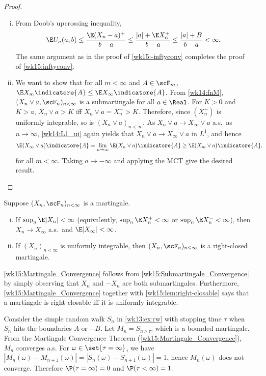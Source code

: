 \documentclass[../aipt.tex]{subfiles}
\begin{document}
\begin{proof}
\begin{enumerate}[(i)]
	\item From Doob's upcrossing inequality, 
	\begin{align*}
	\E U_n(a,b) \leq \frac{\E(X_n-a)^+}{b-a}  \leq \frac{|a|+\E X_n^+}{b-a} \leq \frac{|a|+B}{b-a} <\infty.
	\end{align*}
	The same argument as in the proof of \cref{wk15:-inftyconv} completes the proof of \cref{wk15:inftyconv}.
	
	\item We want to show that for all $m<\infty$ and $A\in\scF_m$, $\E X_m\indicatore{A} \leq \E X_\infty\indicatore{A}$. From \cref{wk14:fnM}, $(X_n\vee a, \scF_n)_{n<\infty}$ is a submartingale for all $a\in\Real$. For $K>0$ and $K>a$, $X_n\vee a > K$ iff $X_n\vee a = X_n^+ >K$. Therefore, since $(X_n^+)$ is uniformly integrable, so is $(X_n\vee a)_{n<\infty}$. As $X_n\vee a \to X_{\infty}\vee a$ a.s.\ as $n\to\infty$, \cref{wk14:L1_ui} again yields that $X_n\vee a \to X_{\infty}\vee a$ in $L^1$, and hence
	\begin{align*}
	\E (X_{\infty}\vee a)\indicatore{A} = \lim_{n\to\infty} \E (X_n\vee a)\indicatore{A} \geq \E(X_m\vee a)\indicatore{A},
	\end{align*}
	for all $m<\infty$. Taking $a\to-\infty$ and applying the MCT give the desired result. 
\end{enumerate}
\end{proof}

\begin{Corollary}\label{wk15:Martingale_Convergence}
Suppose $(X_n,\scF_n)_{n<\infty}$ is a martingale.
\begin{enumerate}[(i)]
	\item If $\sup_n \E|X_n| <\infty$ (equivalently, $\sup_n \E X_n^+ <\infty$ or $\sup_n \E X_n^- <\infty$), then $X_n\to X_\infty$ a.s.\ and $\E|X_\infty| < \infty$.
	\item If $(X_n)_{n<\infty}$ is uniformly integrable, then $(X_n,\scF_n)_{n\leq\infty}$ is a right-closed martingale.
\end{enumerate}
\end{Corollary}
\cref{wk15:Martingale_Convergence} follows from \cref{wk15:Submartingale_Convergence} by simply observing that $X_n$ and $-X_n$ are both submartingales. Furthermore, \cref{wk15:Martingale_Convergence} together with \cref{wk15:lem:right-closable} says that a martingale is right-closable iff it is uniformly integrable. 

\begin{Example}\label{wk15:ex:rw}
Consider the simple random walk $S_n$ in \cref{wk13:ex:rw} with stopping time $\tau$ when $S_n$ hits the boundaries $A$ or $-B$. Let $M_n=S_{n\wedge\tau}$, which is a bounded martingale. From the Martingale Convergence Theorem (\cref{wk15:Martingale_Convergence}), $M_n$ converges a.s. For $\omega\in\set{\tau=\infty}$, we have $|M_n(\omega)-M_{n+1}(\omega)| = |S_n(\omega)-S_{n+1}(\omega)|=1$, hence $M_n(\omega)$ does not converge. Therefore $\P(\tau=\infty)=0$ and $\P(\tau<\infty)=1$.
\end{Example}
\end{document}
